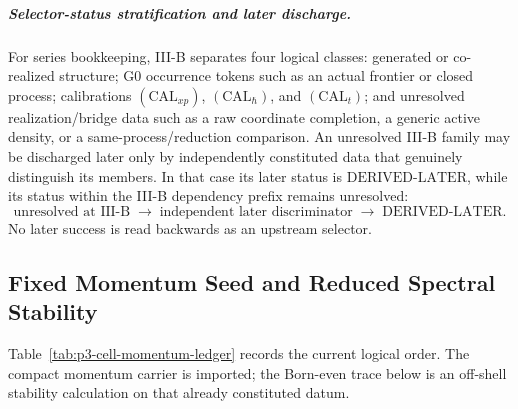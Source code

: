 \documentclass[12pt,a4paper]{article}
\begin{document}
\subparagraph{Selector-status stratification and later discharge.}
For series bookkeeping, III-B separates four logical classes: generated or
co-realized structure; G0 occurrence tokens such as an actual frontier or
closed process; calibrations \((\mathrm{CAL}_{xp})\),
\((\mathrm{CAL}_{\hbar})\), and \((\mathrm{CAL}_{t})\); and unresolved
realization/bridge data such as a raw coordinate completion, a generic active
density, or a same-process/reduction comparison.  An unresolved III-B family
may be discharged later only by independently constituted data that genuinely
distinguish its members.  In that case its later status is
\(\mathrm{DERIVED\text{-}LATER}\), while its status within the III-B dependency prefix remains
unresolved:
\[
 \boxed{
 \text{unresolved at III-B}
 \;\longrightarrow\;
 \text{independent later discriminator}
 \;\longrightarrow\;
 \mathrm{DERIVED\text{-}LATER}.}
\]
No later success is read backwards as an upstream selector.

\label{p3:part:spectral-action-closure}

\subsection{Fixed Momentum Seed and Reduced Spectral Stability}
\label{p3:sec:m_selection}

Table~\ref{tab:p3-cell-momentum-ledger} records the current logical order.
The compact momentum carrier is imported; the Born-even trace below is an
off-shell stability calculation on that already constituted datum.
\end{document}
